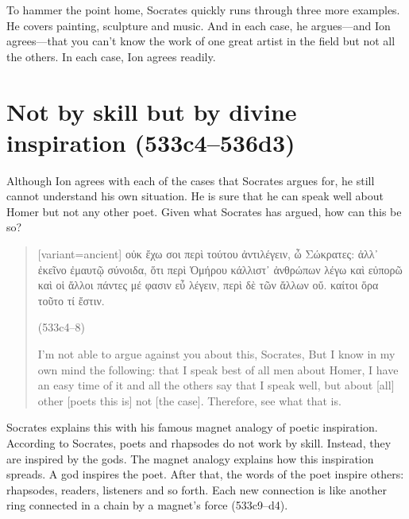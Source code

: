 \documentclass[11pt,letterpaper]{article}
\begin{document}
To hammer the point home, Socrates quickly runs through three more examples. He covers painting, sculpture and music. And in each case, he argues---and Ion agrees---that you can't know the work of one great artist in the field but not all the others. In each case, Ion agrees readily.


\section{Not by skill but by divine inspiration (533c4--536d3)}

Although Ion agrees with each of the cases that Socrates argues for, he still cannot understand his own situation. He is sure that he can speak well about Homer but not any other poet. Given what Socrates has argued, how can this be so?

\begin{quote}
    \begin{greek}[variant=ancient]
    οὐκ ἔχω σοι περὶ τούτου ἀντιλέγειν, ὦ Σώκρατες: ἀλλ᾽ ἐκεῖνο ἐμαυτῷ σύνοιδα, ὅτι περὶ Ὁμήρου κάλλιστ᾽ ἀνθρώπων λέγω καὶ εὐπορῶ καὶ οἱ ἄλλοι πάντες μέ φασιν εὖ λέγειν, περὶ δὲ τῶν ἄλλων οὔ. καίτοι ὅρα τοῦτο τί ἔστιν.
    \end{greek} (533c4--8)

    I'm not able to argue against you about this, Socrates, But I know in my own mind the following: that I speak best of all men about Homer, I have an easy time of it and all the others say that I speak well, but about [all] other [poets this is] not [the case]. Therefore, see what that is.
\end{quote}

Socrates explains this with his famous magnet analogy of poetic inspiration. According to Socrates, poets and rhapsodes do not work by skill. Instead, they are inspired by the gods. The magnet analogy explains how this inspiration spreads. A god inspires the poet. After that, the words of the poet inspire others: rhapsodes, readers, listeners and so forth. Each new connection is like another ring connected in a chain by a magnet's force (533c9--d4).
\end{document}
